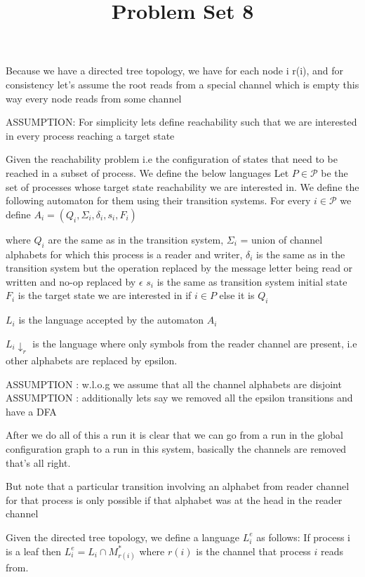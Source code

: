\documentclass{article}
\title{Problem Set 8}
\date{}
\begin{document}
\maketitle


Because we have a directed tree topology, we have for each node i r(i), and for consistency let's assume the root reads from a special channel which is empty 
this way every node reads from some channel


ASSUMPTION: For simplicity lets define reachability such that we are interested in every process reaching a target state

Given the reachability problem i.e the configuration of states that need to be reached in a subset of process. We define the below languages
Let $P \in \mathscr{P}$ be the set of processes whose target state reachability we are interested in. 
We define the following automaton for them using their transition systems.
For every $i \in \mathscr{P}$ we define $A_i = (Q_i, \Sigma_i, \delta_i, s_i, F_i)$

where $Q_i$ are the same as in the transition system, $\Sigma_i$ = union of channel alphabets for which this process is a reader and writer,
$\delta_i$ is the same as in the transition system but the operation replaced by the message letter being read or written and no-op replaced by $\epsilon$ 
$s_i$ is the same as transition system initial state
$F_i$ is the target state we are interested in if $i \in P$ else it is $Q_i$

$L_i$ is the language accepted by the automaton $A_i$

$L_i\!\!\!\downarrow_r$ is the language where only symbols from the reader channel are present, i.e other alphabets are replaced by epsilon. 

ASSUMPTION : w.l.o.g we assume that all the channel alphabets are disjoint
ASSUMPTION : additionally lets say we removed all the epsilon transitions and have a DFA

After we do all of this a run it is clear that we can go from a run in the global configuration graph to a run in this system, basically the channels are removed that's all right. 


But note that a particular transition involving an alphabet from reader channel for that process is only possible if that alphabet was at the head in the reader channel

Given the directed tree topology, we define a language $L_i^e$ as follows:
If process i is a leaf then $L_i^e = L_i \cap M_{r(i)}^*$ where $r(i)$ is the channel that process $i$ reads from.
\end{document}
